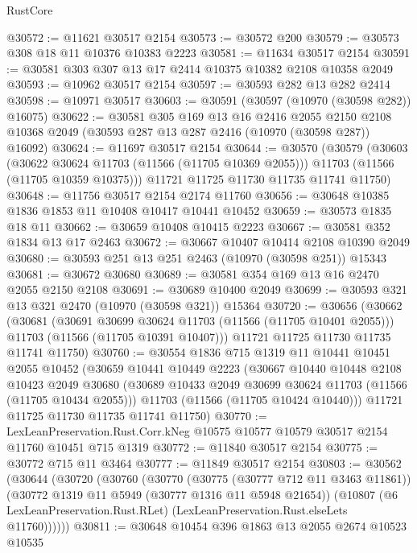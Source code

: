 \begin{lexlean}{RustCore}
\begin{coremodule}
@30572 := @11621 @30517 @2154
@30573 := @30572 @200
@30579 := @30573 @308 @18 @11 @10376 @10383 @2223
@30581 := @11634 @30517 @2154
@30591 := @30581 @303 @307 @13 @17 @2414 @10375 @10382 @2108 @10358 @2049
@30593 := @10962 @30517 @2154
@30597 := @30593 @282 @13 @282 @2414
@30598 := @10971 @30517
@30603 := @30591 (@30597 (@10970 (@30598 @282)) @16075)
@30622 := @30581
    @305
    @169
    @13
    @16
    @2416
    @2055
    @2150
    @2108
    @10368
    @2049
    (@30593 @287 @13 @287 @2416 (@10970 (@30598 @287)) @16092)
@30624 := @11697 @30517 @2154
@30644 := @30570
    (@30579
      (@30603
        (@30622 @30624 @11703 (@11566 (@11705 @10369 @2055)))
        @11703
        (@11566 (@11705 @10359 @10375)))
      @11721
      @11725
      @11730
      @11735
      @11741
      @11750)
@30648 := @11756 @30517 @2154 @2174 @11760
@30656 := @30648 @10385 @1836 @1853 @11 @10408 @10417 @10441 @10452
@30659 := @30573 @1835 @18 @11
@30662 := @30659 @10408 @10415 @2223
@30667 := @30581 @352 @1834 @13 @17 @2463
@30672 := @30667 @10407 @10414 @2108 @10390 @2049
@30680 := @30593 @251 @13 @251 @2463 (@10970 (@30598 @251)) @15343
@30681 := @30672 @30680
@30689 := @30581 @354 @169 @13 @16 @2470 @2055 @2150 @2108
@30691 := @30689 @10400 @2049
@30699 := @30593 @321 @13 @321 @2470 (@10970 (@30598 @321)) @15364
@30720 := @30656
    (@30662
      (@30681
        (@30691 @30699 @30624 @11703 (@11566 (@11705 @10401 @2055)))
        @11703
        (@11566 (@11705 @10391 @10407)))
      @11721
      @11725
      @11730
      @11735
      @11741
      @11750)
@30760 := @30554
    @1836
    @715
    @1319
    @11
    @10441
    @10451
    @2055
    @10452
    (@30659
      @10441
      @10449
      @2223
      (@30667
        @10440
        @10448
        @2108
        @10423
        @2049
        @30680
        (@30689 @10433 @2049 @30699 @30624 @11703 (@11566 (@11705 @10434 @2055)))
        @11703
        (@11566 (@11705 @10424 @10440)))
      @11721
      @11725
      @11730
      @11735
      @11741
      @11750)
@30770 := LexLeanPreservation.Rust.Corr.kNeg
    @10575
    @10577
    @10579
    @30517
    @2154
    @11760
    @10451
    @715
    @1319
@30772 := @11840 @30517 @2154
@30775 := @30772 @715 @11 @3464
@30777 := @11849 @30517 @2154
@30803 := @30562
    (@30644
      (@30720
        (@30760
          (@30770
            (@30775 (@30777 @712 @11 @3463 @11861))
            (@30772 @1319 @11 @5949 (@30777 @1316 @11 @5948 @21654))
            (@10807
              (@6 LexLeanPreservation.Rust.RLet)
              (LexLeanPreservation.Rust.elseLets @11760))))))
@30811 := @30648 @10454 @396 @1863 @13 @2055 @2674 @10523 @10535

\end{coremodule}
\end{lexlean}
